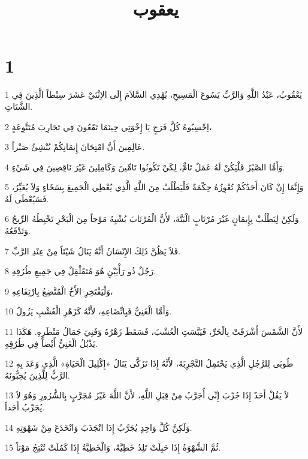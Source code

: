 

\title{يعقوب}


\chapter{1}

\par 1 يَعْقُوبُ، عَبْدُ اللَّهِ وَالرَّبِّ يَسُوعَ الْمَسِيحِ، يُهْدِي السَّلاَمَ إِلَى الاِثْنَيْ عَشَرَ سِبْطاً الَّذِينَ فِي الشَّتَاتِ.
\par 2 اِحْسِبُوهُ كُلَّ فَرَحٍ يَا إِخْوَتِي حِينَمَا تَقَعُونَ فِي تَجَارِبَ مُتَنَّوِعَةٍ،
\par 3 عَالِمِينَ أَنَّ امْتِحَانَ إِيمَانِكُمْ يُنْشِئُ صَبْراً.
\par 4 وَأَمَّا الصَّبْرُ فَلْيَكُنْ لَهُ عَمَلٌ تَامٌّ، لِكَيْ تَكُونُوا تَامِّينَ وَكَامِلِينَ غَيْرَ نَاقِصِينَ فِي شَيْءٍ.
\par 5 وَإِنَّمَا إِنْ كَانَ أَحَدُكُمْ تُعْوِزُهُ حِكْمَةٌ فَلْيَطْلُبْ مِنَ اللَّهِ الَّذِي يُعْطِي الْجَمِيعَ بِسَخَاءٍ وَلاَ يُعَيِّرُ، فَسَيُعْطَى لَهُ.
\par 6 وَلَكِنْ لِيَطْلُبْ بِإِيمَانٍ غَيْرَ مُرْتَابٍ الْبَتَّةَ، لأَنَّ الْمُرْتَابَ يُشْبِهُ مَوْجاً مِنَ الْبَحْرِ تَخْبِطُهُ الرِّيحُ وَتَدْفَعُهُ.
\par 7 فَلاَ يَظُنَّ ذَلِكَ الإِنْسَانُ أَنَّهُ يَنَالُ شَيْئاً مِنْ عِنْدِ الرَّبِّ.
\par 8 رَجُلٌ ذُو رَأْيَيْنِ هُوَ مُتَقَلْقِلٌ فِي جَمِيعِ طُرُقِهِ.
\par 9 وَلْيَفْتَخِرِ الأَخُ الْمُتَّضِعُ بِارْتِفَاعِهِ،
\par 10 وَأَمَّا الْغَنِيُّ فَبِاتِّضَاعِهِ، لأَنَّهُ كَزَهْرِ الْعُشْبِ يَزُولُ.
\par 11 لأَنَّ الشَّمْسَ أَشْرَقَتْ بِالْحَرِّ، فَيَبَّسَتِ الْعُشْبَ، فَسَقَطَ زَهْرُهُ وَفَنِيَ جَمَالُ مَنْظَرِهِ. هَكَذَا يَذْبُلُ الْغَنِيُّ أَيْضاً فِي طُرُقِهِ.
\par 12 طُوبَى لِلرَّجُلِ الَّذِي يَحْتَمِلُ التَّجْرِبَةَ، لأَنَّهُ إِذَا تَزَكَّى يَنَالُ «إِكْلِيلَ الْحَيَاةِ» الَّذِي وَعَدَ بِهِ الرَّبُّ لِلَّذِينَ يُحِبُّونَهُ.
\par 13 لاَ يَقُلْ أَحَدٌ إِذَا جُرِّبَ إِنِّي أُجَرَّبُ مِنْ قِبَلِ اللَّهِ، لأَنَّ اللَّهَ غَيْرُ مُجَرَّبٍ بِالشُّرُورِ وَهُوَ لاَ يُجَرِّبُ أَحَداً.
\par 14 وَلَكِنَّ كُلَّ وَاحِدٍ يُجَرَّبُ إِذَا انْجَذَبَ وَانْخَدَعَ مِنْ شَهْوَتِهِ.
\par 15 ثُمَّ الشَّهْوَةُ إِذَا حَبِلَتْ تَلِدُ خَطِيَّةً، وَالْخَطِيَّةُ إِذَا كَمُلَتْ تُنْتِجُ مَوْتاً.
